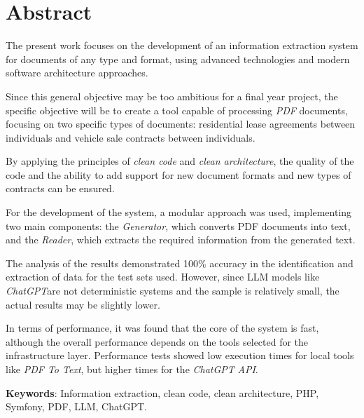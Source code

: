 \newpage
\section*{Abstract}

The present work focuses on the development of an information extraction system for documents of any type and format,
using advanced technologies and modern software architecture approaches.

Since this general objective may be too ambitious for a final year project, the specific objective will be to create a
tool capable of processing \textit{PDF} documents, focusing on two specific types of documents: residential lease
agreements between individuals and vehicle sale contracts between individuals.

By applying the principles of \textit{clean code} and \textit{clean architecture}, the quality of the code and the
ability to add support for new document formats and new types of contracts can be ensured.

For the development of the system, a modular approach was used, implementing two main components: the
\textit{Generator}, which converts PDF documents into text, and the \textit{Reader}, which extracts the required
information from the generated text.

The analysis of the results demonstrated 100\% accuracy in the identification and extraction of data for the test
sets used.
However, since LLM models like \textit{ChatGPT}are not deterministic systems and the sample is relatively small, the
actual results may be slightly lower.

In terms of performance, it was found that the core of the system is fast, although the overall performance depends on
the tools selected for the infrastructure layer.
Performance tests showed low execution times for local tools like \textit{PDF To Text}, but higher times for the
\textit{ChatGPT} \textit{API}.



\vspace{1cm}

\textbf{Keywords}: Information extraction, clean code, clean architecture, PHP, Symfony, PDF, LLM, ChatGPT.

